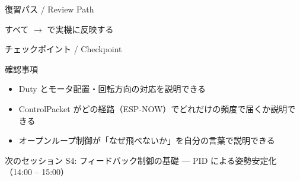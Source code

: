 \begin{frame}{復習パス / Review Path}

  \vspace{0.5em}

  {\small すべて  $\to$  で実機に反映する}
\end{frame}

\begin{frame}{チェックポイント / Checkpoint}
  \begin{alertblock}{確認事項}
    \begin{itemize}
      \item[$\square$] Duty とモータ配置・回転方向の対応を説明できる
      \item[$\square$] ControlPacket がどの経路（ESP-NOW）でどれだけの頻度で届くか説明できる
      \item[$\square$] オープンループ制御が「なぜ飛べないか」を自分の言葉で説明できる
    \end{itemize}
  \end{alertblock}

  \vspace{1em}

  \begin{block}{次のセッション}
    S4: フィードバック制御の基礎 --- PID による姿勢安定化（14:00 -- 15:00）
  \end{block}
\end{frame}

